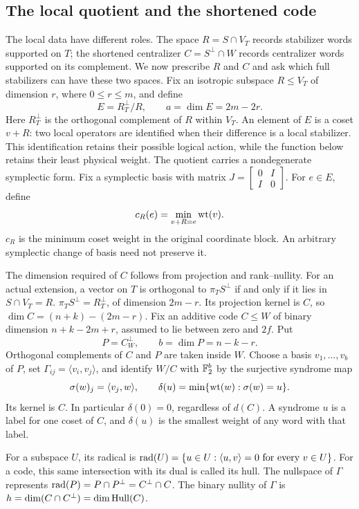 \subsection{The local quotient and the shortened code}

The local data have different roles. The space \(R=S\cap V_T\)
records stabilizer words supported on \(T\); the shortened centralizer
\(C=S^\perp\cap W\) records centralizer words supported on its
complement. We now prescribe \(R\) and \(C\) and ask which full
stabilizers can have these two spaces.
Fix an isotropic subspace \(R\leq V_T\) of dimension \(r\), where
\(0\leq r\leq m\), and define
\[
 E=R_T^\perp/R,\qquad a=\dim E=2m-2r.
\]
Here \(R_T^\perp\) is the orthogonal complement of \(R\) within
\(V_T\).
An element of \(E\) is a coset \(v+R\): two local operators are
identified when their difference is a local stabilizer. This identification
retains their possible logical action, while the function below retains
their least physical weight.
The quotient carries a nondegenerate symplectic form. Fix a symplectic basis with matrix
\(J=\left[\begin{smallmatrix}0&I\\I&0\end{smallmatrix}\right]\).
For \(e\in E\), define
\[
 c_R(e)=\min_{v+R=e}\operatorname{wt}(v).
\]
\(c_R\) is the minimum coset weight in the original coordinate block.
An arbitrary
symplectic change of basis need not preserve it.

The dimension required of \(C\) follows from projection and rank--nullity.
For an actual extension, a vector on \(T\) is orthogonal to
\(\pi_T S^\perp\) if and only if it lies in \(S\cap V_T=R\).
\(\pi_T S^\perp=R_T^\perp\), of dimension \(2m-r\).
Its projection kernel is \(C\), so
\(\dim C=(n+k)-(2m-r)\).
Fix an additive code \(C\leq W\) of binary dimension
\(n+k-2m+r\), assumed to lie between zero and \(2f\). Put
\[
 P=C^\perp_W,\qquad b=\dim P=n-k-r.
\]
Orthogonal complements of \(C\) and \(P\) are taken inside \(W\).
Choose a basis \(v_1,\ldots,v_b\) of \(P\), set
\(\Gamma_{ij}=\langle v_i,v_j\rangle\), and identify \(W/C\)
with \(\mathbb F_2^b\) by the surjective syndrome map
\[
 \sigma(w)_j=\langle v_j,w\rangle,\qquad
 \delta(u)=\min\{\operatorname{wt}(w):\sigma(w)=u\}.
\]
Its kernel is \(C\). In particular \(\delta(0)=0\), regardless of
\(d(C)\). A syndrome \(u\) is a label for one coset of
\(C\), and \(\delta(u)\) is the smallest weight of any word with
that label.

For a subspace \(U\), its radical is
\(\operatorname{rad}(U)=\{u\in U:\langle u,v\rangle=0\text{ for every }v\in U\}\).
For a code, this same intersection with its dual is called its hull.
The nullspace of \(\Gamma\) represents \(\operatorname{rad}(P)=P\cap P^\perp
=C^\perp\cap C\). The binary nullity of \(\Gamma\) is
\(h=\dim(C\cap C^\perp)=\dim\operatorname{Hull}(C)\).

